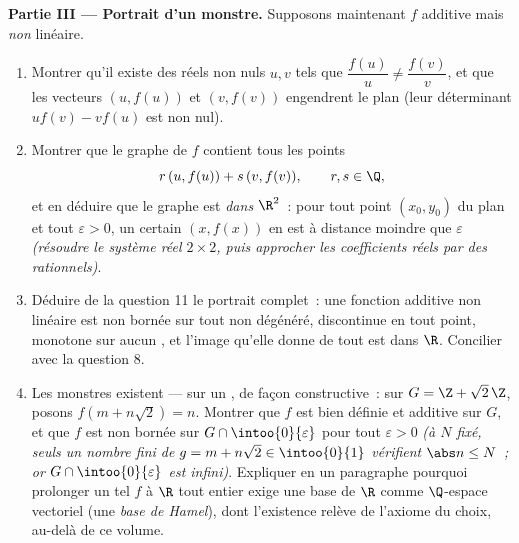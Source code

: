 \begin{problem}[{Devoir maison --- $f(x + y) = f(x) + f(y)$~:
la régularité force la linéarité, et le portrait des monstres}]
\medskip
\noindent\textbf{Partie III --- Portrait d'un monstre.} Supposons
maintenant $f$ additive mais \emph{non} linéaire.
\begin{enumerate}[resume]
  \item Montrer qu'il existe des réels non nuls $u, v$ tels que
        $\dfrac{f(u)}{u} \neq \dfrac{f(v)}{v}$, et que les
        vecteurs $(u, f(u))$ et $(v, f(v))$ engendrent le plan
        (leur déterminant $u f(v) - v f(u)$ est non nul).
  \item Montrer que le graphe de $f$ contient tous les points
        \[
        r\,(u, f(u)) + s\,(v, f(v)), \qquad r, s \in \Q ,
        \]
        et en déduire que le graphe est \emph{ dans $\R^2$}~:
        pour tout point $(x_0, y_0)$ du plan et tout
        $\varepsilon > 0$, un certain $(x, f(x))$ en est à
        distance moindre que $\varepsilon$ \emph{(résoudre le
        système réel $2\times2$, puis approcher les coefficients
        réels par des rationnels)}.
  \item Déduire de la question 11 le portrait complet~: une
        fonction additive non linéaire est non bornée sur tout
         non dégénéré, discontinue en tout point,
        monotone sur aucun , et l'image qu'elle donne
        de tout  est  dans $\R$. Concilier avec la
        question 8.
  \item Les monstres existent --- sur un  , de
        façon constructive~: sur $G = \Z + \sqrt2\,\Z$, posons
        $f(m + n\sqrt2) = n$. Montrer que $f$ est bien définie et
        additive sur $G$, et que $f$ est non bornée sur $G \cap
        \intoo{0}{\varepsilon}$ pour tout $\varepsilon > 0$
        \emph{(à $N$ fixé, seuls un nombre fini de $g = m +
        n\sqrt2 \in \intoo{0}{1}$ vérifient $\abs n \leq N$~; or
        $G \cap \intoo{0}{\varepsilon}$ est infini)}. Expliquer
        en un paragraphe pourquoi prolonger un tel $f$ à $\R$ tout
        entier exige une base de $\R$ comme $\Q$-espace vectoriel
        (une \emph{base de Hamel}), dont l'existence relève de
        l'axiome du choix, au-delà de ce volume.
\end{enumerate}


\end{problem}

